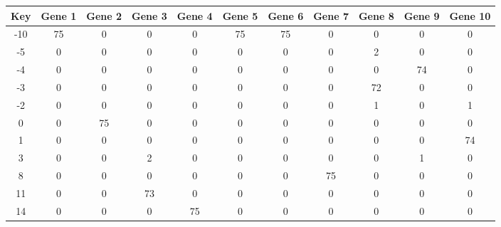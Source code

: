 \begin{tabular}{|c|c|c|c|c|c|c|c|c|c|c|}
\hline
Key & Gene 1 & Gene 2 & Gene 3 & Gene 4 & Gene 5 & Gene 6 & Gene 7 & Gene 8 & Gene 9 & Gene 10 \\
\hline
-10 & 75 & 0 & 0 & 0 & 75 & 75 & 0 & 0 & 0 & 0 \\
-5 & 0 & 0 & 0 & 0 & 0 & 0 & 0 & 2 & 0 & 0 \\
-4 & 0 & 0 & 0 & 0 & 0 & 0 & 0 & 0 & 74 & 0 \\
-3 & 0 & 0 & 0 & 0 & 0 & 0 & 0 & 72 & 0 & 0 \\
-2 & 0 & 0 & 0 & 0 & 0 & 0 & 0 & 1 & 0 & 1 \\
0 & 0 & 75 & 0 & 0 & 0 & 0 & 0 & 0 & 0 & 0 \\
1 & 0 & 0 & 0 & 0 & 0 & 0 & 0 & 0 & 0 & 74 \\
3 & 0 & 0 & 2 & 0 & 0 & 0 & 0 & 0 & 1 & 0 \\
8 & 0 & 0 & 0 & 0 & 0 & 0 & 75 & 0 & 0 & 0 \\
11 & 0 & 0 & 73 & 0 & 0 & 0 & 0 & 0 & 0 & 0 \\
14 & 0 & 0 & 0 & 75 & 0 & 0 & 0 & 0 & 0 & 0 \\
\hline
\end{tabular}